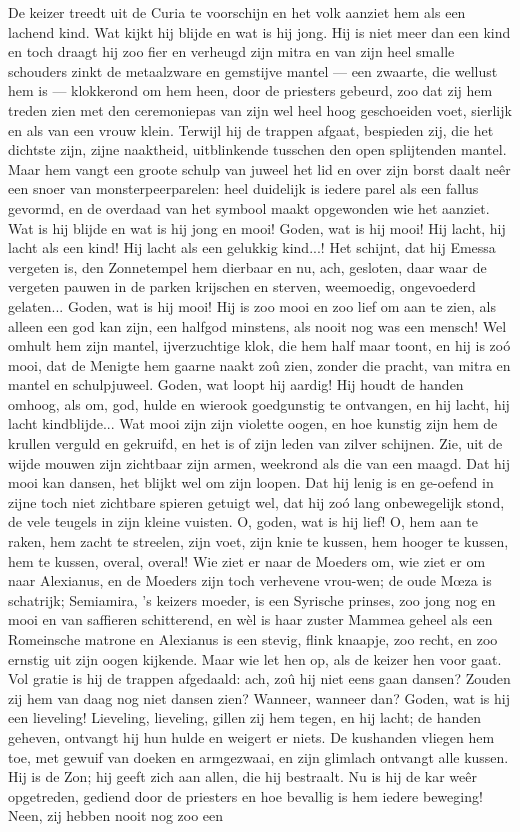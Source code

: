 \documentclass[a4paper, 12pt, oneside, dutch]{article}
\begin{document}
De keizer treedt uit de Curia te voorschijn en het volk aanziet hem als een lachend kind. Wat kijkt hij blijde en wat is hij jong. Hij is niet meer dan een kind en toch draagt hij zoo fier en verheugd zijn mitra en van zijn heel smalle schouders zinkt de metaalzware en gemstijve mantel --- een zwaarte, die wellust hem is --- klokkerond om hem heen, door de priesters gebeurd, zoo dat zij hem treden zien met den ceremoniepas van zijn wel heel hoog geschoeiden voet, sierlijk en als van een vrouw klein. Terwijl hij de trappen afgaat, bespieden zij, die het dichtste zijn, zijne naaktheid, uitblinkende tusschen den open splijtenden mantel. Maar hem vangt een groote schulp van juweel het lid en over zijn borst daalt neêr een snoer van monsterpeerparelen: heel duidelijk is iedere parel als een fallus gevormd, en de overdaad van het symbool maakt opgewonden wie het aanziet. Wat is hij blijde en wat is hij jong en mooi! Goden, wat is hij mooi! Hij lacht, hij lacht als een kind! Hij lacht als een gelukkig kind...! Het schijnt, dat hij Emessa vergeten is, den Zonnetempel hem dierbaar en nu, ach, gesloten, daar waar de vergeten pauwen in de parken krijschen en sterven, weemoedig, ongevoederd gelaten... Goden, wat is hij mooi! Hij is zoo mooi en zoo lief om aan te zien, als alleen een god kan zijn, een halfgod minstens, als nooit nog was een mensch! Wel omhult hem zijn mantel, ijverzuchtige klok, die hem half maar toont, en hij is zoó mooi, dat de Menigte hem gaarne naakt zoû zien, zonder die pracht, van mitra en mantel en schulpjuweel. Goden, wat loopt hij aardig! Hij houdt de handen omhoog, als om, god, hulde en wierook goedgunstig te ontvangen, en hij lacht, hij lacht kindblijde... Wat mooi zijn zijn violette oogen, en hoe kunstig zijn hem de krullen verguld en gekruifd, en het is of zijn leden van zilver schijnen. Zie, uit de wijde mouwen zijn zichtbaar zijn armen, weekrond als die van een maagd. Dat hij mooi kan dansen, het blijkt wel om zijn loopen. Dat hij lenig is en ge-oefend in zijne toch niet zichtbare spieren getuigt wel, dat hij zoó lang onbewegelijk stond, de vele teugels in zijn kleine vuisten. O, goden, wat is hij lief! O, hem aan te raken, hem zacht te streelen, zijn voet, zijn knie te kussen, hem hooger te kussen, hem te kussen, overal, overal! Wie ziet er naar de Moeders om, wie ziet er om naar Alexianus, en de Moeders zijn toch verhevene vrou-wen; de oude Mœza is schatrijk; Semiamira, 's keizers moeder, is een Syrische prinses, zoo jong nog en mooi en van saffieren schitterend, en wèl is haar zuster Mammea geheel als een Romeinsche matrone en Alexianus is een stevig, flink knaapje, zoo recht, en zoo ernstig uit zijn oogen kijkende. Maar wie let hen op, als de keizer hen voor gaat. Vol gratie is hij de trappen afgedaald: ach, zoû hij niet eens gaan dansen? Zouden zij hem van daag nog niet dansen zien? Wanneer, wanneer dan? Goden, wat is hij een lieveling! Lieveling, lieveling, gillen zij hem tegen, en hij lacht; de handen geheven, ontvangt hij hun hulde en weigert er niets. De kushanden vliegen hem toe, met gewuif van doeken en armgezwaai, en zijn glimlach ontvangt alle kussen. Hij is de Zon; hij geeft zich aan allen, die hij bestraalt. Nu is hij de kar weêr opgetreden, gediend door de priesters en hoe bevallig is hem iedere beweging! Neen, zij hebben nooit nog zoo een 
\end{document}
